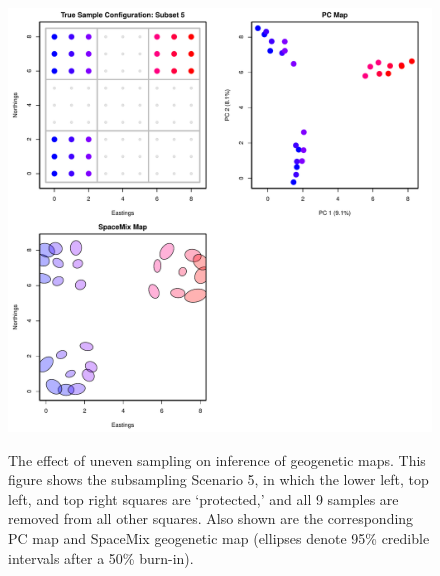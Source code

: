 \documentclass[10pt,letterpaper]{article}
\begin{document}
\begin{figure}
\centering
	{\includegraphics[width=\textwidth]{../figs/sims/grid_subsamp5.pdf}}
	\caption{The effect of uneven sampling on inference of geogenetic maps.  
			This figure shows the subsampling Scenario 5, 
			in which the lower left, top left, and top right squares are `protected,'
			and all 9 samples are removed from all other squares.
			Also shown are the corresponding PC map and 
			SpaceMix geogenetic map 
			(ellipses denote 95\% credible intervals after a 50\% burn-in).}\label{sfig:uneven_sampling_grid_subsamp5}
\end{figure}
\end{document}

